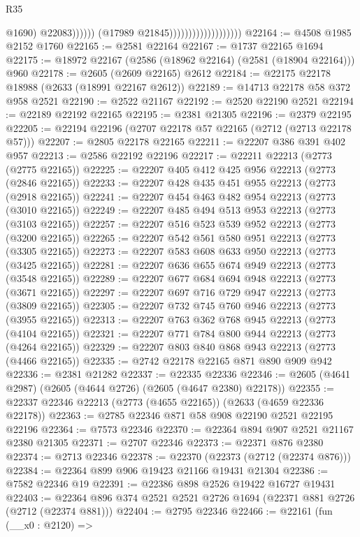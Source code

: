 \begin{lexlean}{R35}
\begin{coremodule}
                                                      @1690)
                                                    @22083))))))
                                        (@17989 @21845)))))))))))))))))))
@22164 := @4508 @1985 @2152 @1760
@22165 := @2581 @22164
@22167 := @1737 @22165 @1694
@22175 := @18972 @22167 (@2586 (@18962 @22164) (@2581 (@18904 @22164))) @960
@22178 := @2605 (@2609 @22165) @2612
@22184 := @22175 @22178 @18988 (@2633 (@18991 @22167 @2612))
@22189 := @14713 @22178 @58 @372 @958 @2521
@22190 := @2522 @21167
@22192 := @2520 @22190 @2521
@22194 := @22189 @22192 @22165
@22195 := @2381 @21305
@22196 := @2379 @22195
@22205 := @22194 @22196 (@2707 @22178 @57 @22165 (@2712 (@2713 @22178 @57)))
@22207 := @2805 @22178 @22165
@22211 := @22207 @386 @391 @402 @957
@22213 := @2586 @22192 @22196
@22217 := @22211 @22213 (@2773 (@2775 @22165))
@22225 := @22207 @405 @412 @425 @956 @22213 (@2773 (@2846 @22165))
@22233 := @22207 @428 @435 @451 @955 @22213 (@2773 (@2918 @22165))
@22241 := @22207 @454 @463 @482 @954 @22213 (@2773 (@3010 @22165))
@22249 := @22207 @485 @494 @513 @953 @22213 (@2773 (@3103 @22165))
@22257 := @22207 @516 @523 @539 @952 @22213 (@2773 (@3200 @22165))
@22265 := @22207 @542 @561 @580 @951 @22213 (@2773 (@3305 @22165))
@22273 := @22207 @583 @608 @633 @950 @22213 (@2773 (@3425 @22165))
@22281 := @22207 @636 @655 @674 @949 @22213 (@2773 (@3548 @22165))
@22289 := @22207 @677 @684 @694 @948 @22213 (@2773 (@3671 @22165))
@22297 := @22207 @697 @716 @729 @947 @22213 (@2773 (@3809 @22165))
@22305 := @22207 @732 @745 @760 @946 @22213 (@2773 (@3955 @22165))
@22313 := @22207 @763 @362 @768 @945 @22213 (@2773 (@4104 @22165))
@22321 := @22207 @771 @784 @800 @944 @22213 (@2773 (@4264 @22165))
@22329 := @22207 @803 @840 @868 @943 @22213 (@2773 (@4466 @22165))
@22335 := @2742 @22178 @22165 @871 @890 @909 @942
@22336 := @2381 @21282
@22337 := @22335 @22336
@22346 := @2605 (@4641 @2987) (@2605 (@4644 @2726) (@2605 (@4647 @2380) @22178))
@22355 := @22337 @22346 @22213 (@2773 (@4655 @22165)) (@2633 (@4659 @22336 @22178))
@22363 := @2785 @22346 @871 @58 @908 @22190 @2521 @22195 @22196
@22364 := @7573 @22346
@22370 := @22364 @894 @907 @2521 @21167 @2380 @21305
@22371 := @2707 @22346
@22373 := @22371 @876 @2380
@22374 := @2713 @22346
@22378 := @22370 (@22373 (@2712 (@22374 @876)))
@22384 := @22364 @899 @906 @19423 @21166 @19431 @21304
@22386 := @7582 @22346 @19
@22391 := @22386 @898 @2526 @19422 @16727 @19431
@22403 := @22364 @896 @374 @2521 @2521 @2726 @1694 (@22371 @881 @2726 (@2712 (@22374 @881)))
@22404 := @2795 @22346
@22466 := @22161
    (fun (__x0 : @2120) =>

\end{coremodule}
\end{lexlean}

